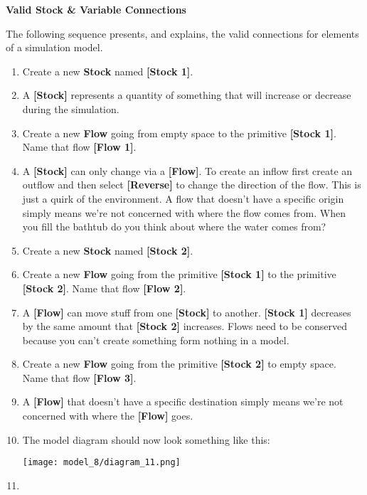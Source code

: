 \documentclass[]{memoir}
\makeatletter
\def\maxwidth{\ifdim\Gin@nat@width>\linewidth\linewidth
\else\Gin@nat@width\fi}
\let\Oldincludegraphics\includegraphics
\renewcommand{\includegraphics}[1]{\Oldincludegraphics[width=\maxwidth]{#1}}
\newcommand{\p}[1]{\textbf{{[}#1{]}}}
\renewcommand{\a}[1]{\textbf{#1}}
\makeatother
\begin{document}
\FloatBarrier 

\begin{oframed}\textbf{Valid Stock \& Variable Connections} 

 The following sequence presents, and explains, the valid connections for elements of a simulation model.

\begin{enumerate}
\item Create a new \a{Stock} named \p{Stock 1}.
\item 

A \p{Stock} represents a quantity of something that will increase or decrease during the simulation.


\item Create a new \a{Flow} going from empty space to the primitive \p{Stock 1}. Name that flow \p{Flow 1}.
\item 

A \p{Stock} can only change via a \p{Flow}. To create an inflow first create an outflow and then select \p{Reverse} to change the direction of the flow. This is just a quirk of the environment. A flow that doesn't have a specific origin simply means we're not concerned with where the flow comes from. When you fill the bathtub do you think about where the water comes from?


\item Create a new \a{Stock} named \p{Stock 2}.
\item Create a new \a{Flow} going from the primitive \p{Stock 1} to the primitive \p{Stock 2}. Name that flow \p{Flow 2}.
\item 

A \p{Flow} can move stuff from one \p{Stock} to another. \p{Stock 1} decreases by the same amount that \p{Stock 2} increases. Flows need to be conserved because you can't create something form nothing in a model.


\item Create a new \a{Flow} going from the primitive \p{Stock 2} to empty space. Name that flow \p{Flow 3}.
\item 

A \p{Flow} that doesn't have a specific destination simply means we're not concerned with where the \p{Flow} goes.


\item The model diagram should now look something like this: \par \begin{minipage}{\linewidth}  \centering \texttt{[image: model\_8/diagram\_11.png]}
\end{minipage}
\item 


\end{enumerate}
\end{oframed}
\end{document}
